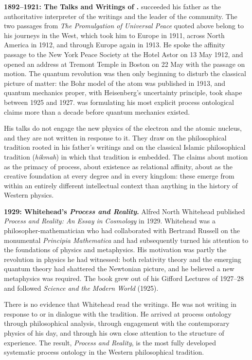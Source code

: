 \textbf{1892--1921: The Talks and Writings of \AbdulBaha.}
\AbdulBaha succeeded his father as the authoritative interpreter of the \bahai
writings and the leader of the \bahai community.
The two passages from \textit{The Promulgation of Universal Peace} quoted above
belong to his journeys in the West, which took him to Europe in 1911, across
North America in 1912, and through Europe again in 1913.
He spoke the affinity passage to the New York Peace Society at the Hotel Astor
on 13 May 1912, and opened an address at Tremont Temple in Boston on 22 May
with the passage on motion.
The quantum revolution was then only beginning to disturb the classical picture
of matter: the Bohr model of the atom was published in 1913, and quantum
mechanics proper, with Heisenberg's uncertainty principle, took shape between
1925 and 1927.
\AbdulBaha was formulating his most explicit process ontological claims more
than a decade before quantum mechanics existed.

His talks do not engage the new physics of the electron and the atomic nucleus,
and they are not written in response to it.
They draw on the \bahai philosophical tradition rooted in his father's writings
and on the classical Islamic philosophical tradition (\emph{hikmah}) in which
that tradition is embedded.
The claims about motion as the primacy of process, about existence as relational
affinity, about \mahabbat as the creative foundation at every degree and in every
kingdom: these emerge from within an entirely different intellectual context than
anything in the history of Western physics.

\textbf{1929: Whitehead's \textit{Process and Reality}.}
Alfred North Whitehead published \textit{Process and Reality: An Essay in
Cosmology} in 1929.
Whitehead was a philosopher-mathematician who had collaborated with Bertrand
Russell on the monumental \textit{Principia Mathematica} and had subsequently
turned his attention to the foundations of physics and metaphysics.
His motivation was partly the revolution in physics he had witnessed: both
relativity theory and the emerging quantum theory had shattered the Newtonian
picture, and he believed a new metaphysics was required.
The book grew out of his Gifford Lectures of 1927--28 and followed
\textit{Science and the Modern World} (1925).

There is no evidence that Whitehead read the \bahai writings.
He was not writing in response to or in dialogue with the \bahai tradition.
He arrived at process ontology through philosophical analysis, through engagement
with the contemporary physics of his day, and through his own close attention
to the structure of experience.
The result, \textit{Process and Reality}, is the most fully developed systematic
process ontology in the Western philosophical tradition.

